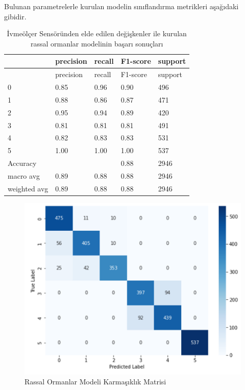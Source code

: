 \documentclass[12pt,twoside]{deuthesis}
\begin{document}
Bulunan parametrelerle kurulan modelin sınıflandırma metrikleri aşağıdaki gibidir.
\begin{longtable}[]{@{}lllll@{}}
\caption{\label{tab:irf} İvmeölçer Sensöründen elde edilen değişkenler ile kurulan rassal ormanlar modelinin başarı sonuçları}\tabularnewline
\toprule()
& precision & recall & F1-score & support \\
\midrule()
\endfirsthead
\toprule()
& precision & recall & F1-score & support \\
\midrule()
\endhead
0 & 0.85 & 0.96 & 0.90 & 496 \\
1 & 0.88 & 0.86 & 0.87 & 471 \\
2 & 0.95 & 0.94 & 0.89 & 420 \\
3 & 0.81 & 0.81 & 0.81 & 491 \\
4 & 0.82 & 0.83 & 0.83 & 531 \\
5 & 1.00 & 1.00 & 1.00 & 537 \\
Accuracy & & & 0.88 & 2946 \\
macro avg & 0.89 & 0.88 & 0.88 & 2946 \\
weighted avg & 0.89 & 0.88 & 0.88 & 2946 \\
\bottomrule()
\end{longtable}
\begin{figure}

{\centering \includegraphics[width=0.9\linewidth,height=0.35\textheight]{figure/irandom_forest_confmat} 

}

\caption{Rassal Ormanlar Modeli Karmaşıklık Matrisi}\label{fig:irandomforestconfmat}
\end{figure}
\end{document}
